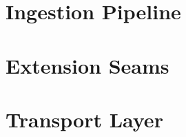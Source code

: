 \documentclass[11pt,openany]{book}
\begin{document}
\part{Ingestion Pipeline}






\part{Extension Seams}






\part{Transport Layer}






\appendix




\end{document}
